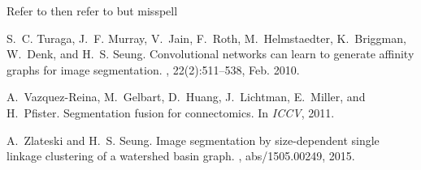 \documentclass{article}
\begin{document}
  Refer to \cite{turaga2010affinity} then refer to \cite{vazquez11} but misspell \cite{zlateskiS15_asdf}

  \begin{thebibliography}{}

    S.~C. Turaga, J.~F. Murray, V.~Jain, F.~Roth, M.~Helmstaedter, K.~Briggman,
      W.~Denk, and H.~S. Seung.
    \newblock Convolutional networks can learn to generate affinity graphs for
      image segmentation.
    , 22(2):511--538, Feb. 2010.

    A.~Vazquez-Reina, M.~Gelbart, D.~Huang, J.~Lichtman, E.~Miller, and H.~Pfister.
    \newblock Segmentation fusion for connectomics.
    \newblock In {\em ICCV}, 2011.

    A.~Zlateski and H.~S. Seung.
    \newblock Image segmentation by size-dependent single linkage clustering of a
      watershed basin graph.
    , abs/1505.00249, 2015.

  \end{thebibliography}
\end{document}
